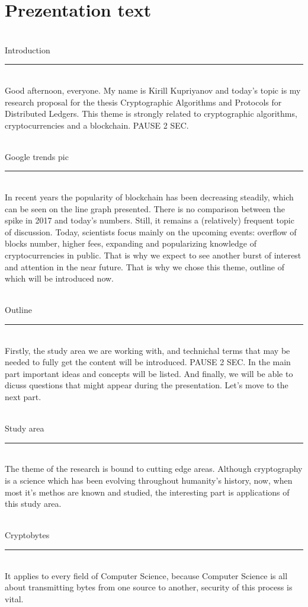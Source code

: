 \documentclass[12pt]{article}
\renewcommand{\line}[1]{\noindent\\{#1}\vspace{-0.42cm}\\\rule{\textwidth}{1pt}\\}
\begin{document}
\section*{Prezentation text}

\line{Introduction}
Good afternoon, everyone. My name is Kirill Kupriyanov and today's topic is
my research proposal for the thesis Cryptographic Algorithms and Protocols for
Distributed Ledgers. This theme is strongly related to cryptographic algorithms,
cryptocurrencies and a blockchain. PAUSE 2 SEC.

\line{Google trends pic}
In recent years the popularity of blockchain has been decreasing steadily,
which can be seen on the line graph presented. There is no comparison between
the spike in 2017 and today's numbers. Still, it remains a (relatively)
frequent topic of discussion. Today, scientists focus mainly on the upcoming
events: overflow of blocks number, higher fees, expanding and popularizing
knowledge of cryptocurrencies in public. That is why we expect to see another
burst of interest and attention in the near future.
That is why we chose this theme, outline of which will be introduced now.

\line{Outline}
Firstly, the study area we are working with, and technichal terms that may be
needed to fully get the content will be introduced. PAUSE 2 SEC. In the main
part important ideas and concepts will be listed. And finally, we will be able
to dicuss questions that might appear during the presentation. Let's move to
the next part.

\line{Study area}
The theme of the research is bound to cutting edge areas. Although
cryptography is a science which has been evolving throughout humanity's
history, now, when most it's methos are known and studied, the interesting part
is applications of this study area.

\line{Cryptobytes}
It applies to every field of Computer Science, because Computer Science is all
about transmitting bytes from one source to another, security of this process
is vital.
\end{document}
